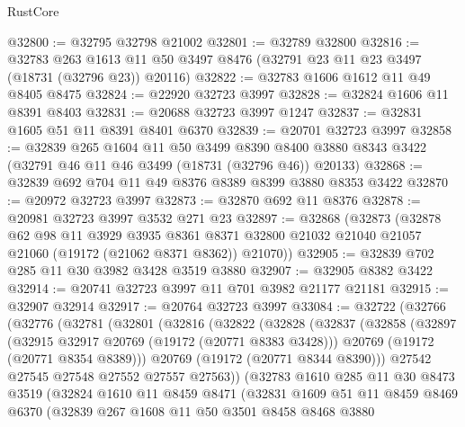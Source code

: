 \begin{lexlean}{RustCore}
\begin{coremodule}
@32800 := @32795 @32798 @21002
@32801 := @32789 @32800
@32816 := @32783
    @263
    @1613
    @11
    @50
    @3497
    @8476
    (@32791 @23 @11 @23 @3497 (@18731 (@32796 @23)) @20116)
@32822 := @32783 @1606 @1612 @11 @49 @8405 @8475
@32824 := @22920 @32723 @3997
@32828 := @32824 @1606 @11 @8391 @8403
@32831 := @20688 @32723 @3997 @1247
@32837 := @32831 @1605 @51 @11 @8391 @8401 @6370
@32839 := @20701 @32723 @3997
@32858 := @32839
    @265
    @1604
    @11
    @50
    @3499
    @8390
    @8400
    @3880
    @8343
    @3422
    (@32791 @46 @11 @46 @3499 (@18731 (@32796 @46)) @20133)
@32868 := @32839 @692 @704 @11 @49 @8376 @8389 @8399 @3880 @8353 @3422
@32870 := @20972 @32723 @3997
@32873 := @32870 @692 @11 @8376
@32878 := @20981 @32723 @3997 @3532 @271 @23
@32897 := @32868
    (@32873
      (@32878
        @62
        @98
        @11
        @3929
        @3935
        @8361
        @8371
        @32800
        @21032
        @21040
        @21057
        @21060
        (@19172 (@21062 @8371 @8362))
        @21070))
@32905 := @32839 @702 @285 @11 @30 @3982 @3428 @3519 @3880
@32907 := @32905 @8382 @3422
@32914 := @20741 @32723 @3997 @11 @701 @3982 @21177 @21181
@32915 := @32907 @32914
@32917 := @20764 @32723 @3997
@33084 := @32722
    (@32766
      (@32776
        (@32781
          (@32801
            (@32816
              (@32822
                (@32828
                  (@32837
                    (@32858
                      (@32897
                        (@32915 @32917 @20769 (@19172 (@20771 @8383 @3428)))
                        @20769
                        (@19172 (@20771 @8354 @8389)))
                      @20769
                      (@19172 (@20771 @8344 @8390)))
                    @27542
                    @27545
                    @27548
                    @27552
                    @27557
                    @27563))
                (@32783
                  @1610
                  @285
                  @11
                  @30
                  @8473
                  @3519
                  (@32824
                    @1610
                    @11
                    @8459
                    @8471
                    (@32831
                      @1609
                      @51
                      @11
                      @8459
                      @8469
                      @6370
                      (@32839
                        @267
                        @1608
                        @11
                        @50
                        @3501
                        @8458
                        @8468
                        @3880

\end{coremodule}
\end{lexlean}
